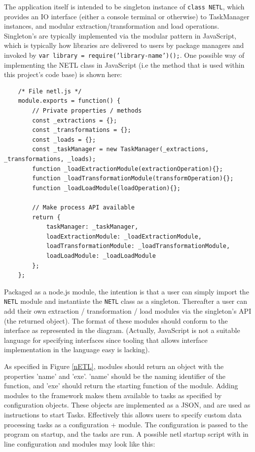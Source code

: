 The application itself is intended to be singleton instance of \texttt{class NETL{}}, which provides an IO interface (either a console terminal or otherwise) to TaskManager instances, and modular extraction/transformation and load operations. Singleton's are typically implemented via the modular pattern in JavaScript, which is typically how libraries are delivered to users by package managers and invoked by \texttt{var library = require('library-name')();}. One possible way of implementing the NETL class in JavaScript (i.e the method that is used within this project's code base) is shown here:

\begin{verbatim}
    /* File netl.js */
    module.exports = function() {
        // Private properties / methods
        const _extractions = {};
        const _transformations = {};
        const _loads = {};        
        const _taskManager = new TaskManager(_extractions, _transformations, _loads);
        function _loadExtractionModule(extractionOperation){};
        function _loadTransformationModule(transformOperation){};
        function _loadLoadModule(loadOperation){};

        // Make process API available
        return {
            taskManager: _taskManager,
            loadExtractionModule: _loadExtractionModule,
            loadTransformationModule: _loadTransformationModule,
            loadLoadModule: _loadLoadModule
        };
    };
\end{verbatim}

Packaged as a node.js module, the intention is that a user can simply import the \texttt{NETL} module and instantiate the \texttt{NETL} class as a singleton. Thereafter a user can add their own extraction / transformation / load modules via the singleton's API (the returned object). The format of these modules should conform to the interface as represented in the diagram. (Actually, JavaScript is not a suitable language for specifying interfaces since tooling that allows interface implementation in the language easy is lacking).

As specified in Figure \ref{nETL}, modules should return an object with the properties 'name' and 'exe'. 'name' should be the naming identifier of the function, and 'exe' should return the starting function of the module. Adding modules to the framework makes them available to tasks as specified by configuration objects. These objects are implemented as a JSON, and are used as instructions to start Tasks. Effectively this allows users to specify custom data processing tasks as a configuration + module. The configuration is passed to the program on startup, and the tasks are run. A possible netl startup script with in line configuration and modules may look like this:

